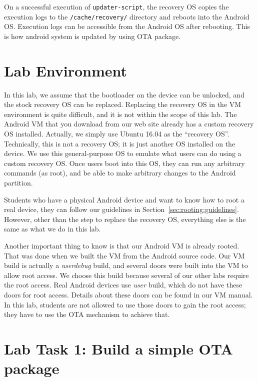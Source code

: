 On a successful execution of \texttt{updater-script}, the recovery OS copies the
execution logs to the \texttt{/cache/recovery/} directory and reboots into the Android
OS. Execution logs can be accessible from the Android OS after rebooting.
This is how android system is updated by using OTA package.


\section{Lab Environment}

In this lab, we assume that the bootloader on the device can be unlocked,
and the stock recovery OS can be replaced. Replacing the recovery OS in the VM environment
is quite difficult, and it is not within the scope of this lab. The Android
VM that you download from our web site already has a custom recovery OS
installed. Actually, we simply use Ubuntu 16.04 as
the ``recovery OS''. Technically, this is not a recovery OS; it is just another OS
installed on the device. We use this general-purpose OS to emulate what
users can do using a custom recovery OS. Once users boot into this OS, they can run any
arbitrary commands (as root), and be able to make arbitrary changes to the
Android partition. 



Students who have a physical Android device and want to know how to root a
real device, they can follow our guidelines in
Section~\ref{sec:rooting:guidelines}. However, other than the step to replace
the recovery OS, everything else is the same as what we do in this lab.  


Another important thing to know is that our Android VM is already rooted. That was
done when we built the VM from the Android source code. Our VM build is
actually a \textit{userdebug} build, and several doors were built into the VM
to allow root access.  We choose this build because several of our other labs require the root
access. Real Android devices use \textit{user} build, which do not have these doors
for root access. Details about these doors can be found in our VM manual. 
In this lab, students are not allowed to use those doors to gain the root
access; they have to use the OTA mechanism to achieve that.



\section{Lab Task 1: Build a simple OTA package}

